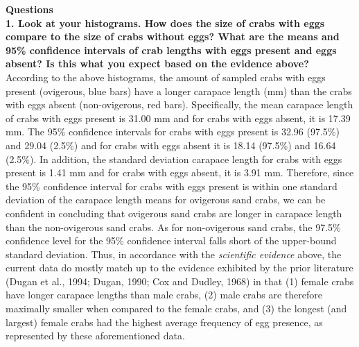 \documentclass[11pt]{article}
\begin{document}
{\bf Questions} \\
{\bf 1. Look at your histograms. How does the size of crabs with eggs compare to the size of crabs without eggs? What are the means and 95\% confidence intervals of crab lengths with eggs present and eggs absent? Is this what you expect based on the evidence above?} \\
According to the above histograms, the amount of sampled crabs with eggs present (ovigerous, blue bars) have a longer carapace length (mm) than the crabs with eggs absent (non-ovigerous, red bars). Specifically, the mean carapace length of crabs with eggs present is 31.00 mm and for crabs with eggs absent, it is 17.39 mm. The 95\% confidence intervals for crabs with eggs present is 32.96 (97.5\%) and 29.04 (2.5\%) and for crabs with eggs absent it is 18.14 (97.5\%) and 16.64 (2.5\%). In addition, the standard deviation carapace length for crabs with eggs present is 1.41 mm and for crabs with eggs absent, it is 3.91 mm. Therefore, since the 95\% confidence interval for crabs with eggs present is within one standard deviation of the carapace length means for ovigerous sand crabs, we can be confident in concluding that ovigerous sand crabs are longer in carapace length than the non-ovigerous sand crabs. As for non-ovigerous sand crabs, the 97.5\% confidence level for the 95\% confidence interval falls short of the upper-bound standard deviation. Thus, in accordance with the {\it scientific evidence} above, the current data do mostly match up to the evidence exhibited by the prior literature (Dugan et al., 1994; Dugan, 1990; Cox and Dudley, 1968) in that (1) female crabs have longer carapace lengths than male crabs, (2) male crabs are therefore maximally smaller when compared to the female crabs, and (3) the longest (and largest) female crabs had the highest average frequency of egg presence, as represented by these aforementioned data. \\
\end{document}
